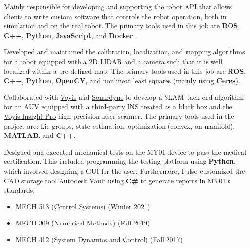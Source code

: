 \documentclass[10pt,letter]{altacv}
\begin{document}

Mainly responsible for developing and supporting the robot API that allows clients to write custom software that controls the robot operation, both in simulation and on the real robot.
The primary tools used in this job are \textbf{ROS}, \textbf{C++}, \textbf{Python}, \textbf{JavaScript}, and \textbf{Docker}.

\divider

Developed and maintained the calibration, localization, and mapping algorithms for a robot equipped with a 2D LIDAR and a camera such that it is well localized within a pre-defined map.
The primary tools used in this job are \textbf{ROS}, \textbf{C++}, \textbf{Python}, \textbf{OpenCV}, and nonlinear least squares (mainly using \href{https://github.com/ceres-solver/ceres-solver}{\textbf{Ceres}}).

\divider

Collaborated with \href{https://voyis.com/}{Voyis} and \href{https://www.sonardyne.com/}{Sonardyne} to develop a SLAM back-end algorithm for an AUV equipped with a third-party INS treated as a black box and the \href{https://voyis.com/insight-pro}{Voyis Insight Pro} high-precision laser scanner.
The primary tools used in the project are:
Lie groups, state estimation, optimization (convex, on-manifold), \textbf{MATLAB}, and \textbf{C++}.

\divider

Designed and executed mechanical tests on the MY01 device to pass the medical certification.
This included programming the testing platform using \textbf{Python}, which involved designing a GUI for the user.
Furthermore, I also customized the CAD storage tool Autodesk Vault using \textbf{C\#} to generate reports in MY01's standards.

\divider

\begin{itemize}[noitemsep]
  \item \href{https://www.mcgill.ca/study/2022-2023/courses/mech-513}{MECH 513 (Control Systems)} (Winter 2021)
  \item \href{https://www.mcgill.ca/study/2022-2023/courses/mech-309}{MECH 309 (Numerical Methods)} (Fall 2019)
  \item \href{https://www.mcgill.ca/study/2022-2023/courses/mech-412}{MECH 412 (System Dynamics and Control)} (Fall 2017)
\end{itemize}
\end{document}
